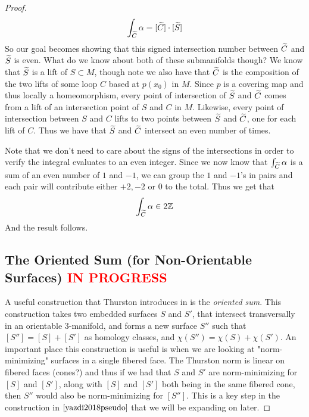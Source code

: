 \begin{proof}
    \begin{align*}
        \int_{\widetilde{C}} \alpha = [\widetilde{C}] \cdot [\widetilde{S}]
    \end{align*}
    So our goal becomes showing that this signed intersection number between $\widetilde{C}$ and $\widetilde{S}$ is even. What do we know about both of these submanifolds though? We know that $\widetilde{S}$ is a lift of $S \subset M$, though note we also have that $\widetilde{C}$ is the composition of the two lifts of some loop $C$ based at $p(x_0)$ in $M$. Since $p$ is a covering map and thus locally a homeomorphism, every point of intersection of $\widetilde{S}$ and $\widetilde{C}$ comes from a lift of an intersection point of $S$ and $C$ in $M$. Likewise, every point of intersection between $S$ and $C$ lifts to two points between $\widetilde{S}$ and $\widetilde{C}$, one for each lift of $C$. Thus we have that $\widetilde{S}$ and $\widetilde{C}$ intersect an even number of times.

    Note that we don't need to care about the signs of the intersections in order to verify the integral evaluates to an even integer. Since we now know that $\int_{\widetilde{C}} \alpha$ is a sum of an even number of $1$ and $-1$, we can group the $1$ and $-1$'s in pairs and each pair will contribute either $+2,-2$ or $0$ to the total. Thus we get that
    \begin{align*}
        \int_{\widetilde{C}} \alpha \in 2\mathbb{Z}
    \end{align*}
    And the result follows.

\subsection{The Oriented Sum (for Non-Orientable Surfaces) \textcolor{red}{IN PROGRESS}}

A useful construction that Thurston introduces in \cite{thurston1986norm} is the \textit{oriented sum}. This construction takes two embedded surfaces $S$ and $S'$, that intersect transversally in an orientable 3-manifold, and forms a new surface $S''$ such that $[S''] = [S] + [S']$ as homology classes, and $\chi(S'') = \chi(S) + \chi(S')$. An important place this construction is useful is when we are looking at "norm-minimizing" surfaces in a single fibered face. The Thurston norm is linear on fibered faces (cones?) and thus if we had that $S$ and $S'$ are norm-minimizing for $[S]$ and $[S']$, along with $[S]$ and $[S']$ both being in the same fibered cone, then $S''$ would also be norm-minimizing for $[S'']$. This is a key step in the construction in $\cite{yazdi2018pseudo}$ that we will be expanding on later.


\end{proof}
